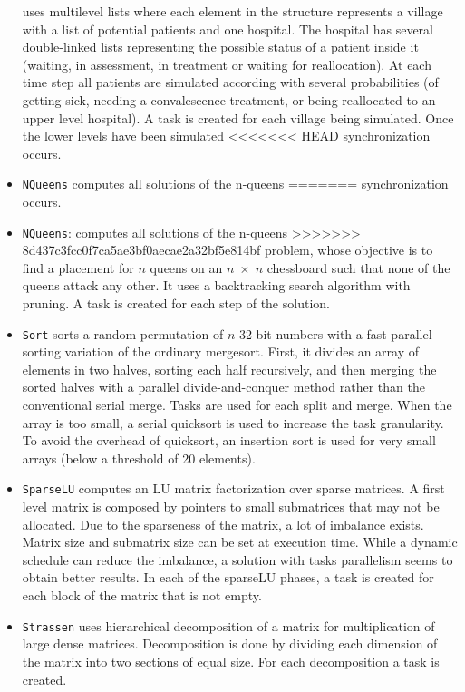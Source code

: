 \documentclass[sigconf]{acmart}
\begin{document}
\begin{itemize}
uses multilevel lists where each element in the structure  represents  a
village with  a  list  of  potential patients and one hospital. The hospital
has several double-linked lists representing the possible status of a patient
inside it (waiting, in assessment,   in   treatment   or   waiting   for
reallocation).  At  each time step  all  patients  are  simulated  according
with several probabilities (of getting sick, needing a convalescence treatment,
or  being  reallocated to  an  upper  level  hospital).  A  task  is  created
for  each  village being  simulated. Once the lower levels have been simulated
<<<<<<< HEAD
synchronization occurs. 
\item \texttt{NQueens} computes  all  solutions  of  the n-queens
=======
synchronization occurs.
\item \texttt{NQueens}: computes  all  solutions  of  the n-queens
>>>>>>> 8d437c3fcc0f7ca5ae3bf0aecae2a32bf5e814bf
problem, whose objective is to find a placement for $n$ queens on an $n \;
\times \; n$ chessboard such that none of the queens attack any other. It uses
a backtracking search algorithm with pruning. A task is created for each step
of the solution.
\item \texttt{Sort} sorts a random permutation of $n$ 32-bit numbers with  a
fast  parallel  sorting  variation of  the  ordinary mergesort.  First, it
divides an array of elements in two halves, sorting  each half  recursively,
and  then  merging  the  sorted halves with a parallel divide-and-conquer
method rather than the  conventional  serial  merge.  Tasks are  used  for
each  split and merge. When the array is too small, a serial quicksort is used
to increase  the  task  granularity.  To  avoid  the overhead of  quicksort, an
insertion  sort  is  used  for  very  small  arrays (below a threshold of 20
elements).
\item \texttt{SparseLU} computes an LU matrix factorization over
sparse matrices. A first level matrix is composed by pointers to  small
submatrices  that  may  not  be  allocated.  Due  to  the sparseness  of  the
matrix,  a  lot  of  imbalance  exists.  Matrix size and submatrix size can be
set at execution time. While a dynamic schedule can reduce the imbalance, a
solution with tasks parallelism seems to obtain better results. In each
of the sparseLU  phases,  a  task  is  created  for  each  block  of  the
matrix that is not empty.
\item \texttt{Strassen} uses  hierarchical  decomposition of a
matrix for multiplication of large dense matrices. Decomposition is done by
dividing each dimension of the matrix into  two  sections  of  equal size. For
each decomposition a task is created.
\end{itemize}
\end{document}
